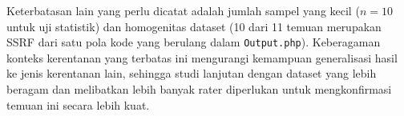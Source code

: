 Keterbatasan lain yang perlu dicatat adalah jumlah sampel yang kecil
($n = 10$ untuk uji statistik) dan homogenitas dataset (10 dari 11
temuan merupakan SSRF dari satu pola kode yang berulang dalam
\texttt{Output.php}). Keberagaman konteks kerentanan yang terbatas
ini mengurangi kemampuan generalisasi hasil ke jenis kerentanan lain,
sehingga studi lanjutan dengan dataset yang lebih beragam dan
melibatkan lebih banyak rater diperlukan untuk mengkonfirmasi temuan
ini secara lebih kuat.